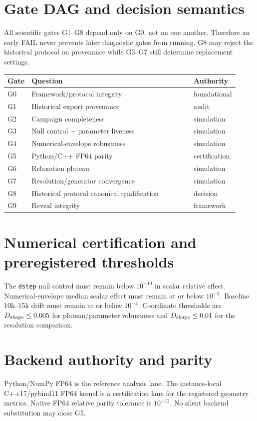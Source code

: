 \documentclass[11pt,a4paper]{article}
\newcommand{\code}[1]{\texttt{#1}}
\begin{document}
\section{Gate DAG and decision semantics}
All scientific gates G1--G8 depend only on G0, not on one another. Therefore an early FAIL never prevents later diagnostic gates from running. G8 may reject the historical protocol on provenance while G3--G7 still determine replacement settings.
\begin{longtable}{L{0.07\linewidth}L{0.70\linewidth}L{0.15\linewidth}}\toprule Gate&Question&Authority\\\midrule
G0&Framework/protocol integrity&foundational\\
G1&Historical export provenance&audit\\
G2&Campaign completeness&simulation\\
G3&Null control + parameter liveness&simulation\\
G4&Numerical-envelope robustness&simulation\\
G5&Python/C++ FP64 parity&certification\\
G6&Relaxation plateau&simulation\\
G7&Resolution/generator convergence&simulation\\
G8&Historical protocol canonical qualification&decision\\
G9&Reveal integrity&framework\\\bottomrule\end{longtable}
\section{Numerical certification and preregistered thresholds}
The \code{dstep} null control must remain below $10^{-10}$ in scalar relative effect. Numerical-envelope median scalar effect must remain at or below $10^{-2}$. Baseline 10k--15k drift must remain at or below $10^{-2}$. Coordinate thresholds are $D_{\rm shape}\le0.005$ for plateau/parameter robustness and $D_{\rm shape}\le0.01$ for the resolution comparison.
\section{Backend authority and parity}
Python/NumPy FP64 is the reference analysis lane. The instance-local C++17/pybind11 FP64 kernel is a certification lane for the registered geometry metrics. Native FP64 relative parity tolerance is $10^{-12}$. No silent backend substitution may close G5.
\end{document}
